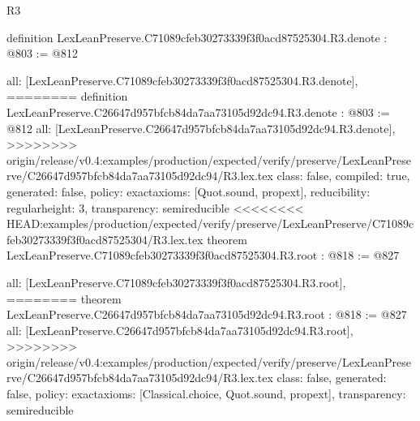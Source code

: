 \begin{lexlean}{R3}
\begin{coremodule}
{{{{{{definition LexLeanPreserve.C71089cfeb30273339f3f0acd87525304.R3.denote : @803 := @812 {
  all: [LexLeanPreserve.C71089cfeb30273339f3f0acd87525304.R3.denote],
========
definition LexLeanPreserve.C26647d957bfcb84da7aa73105d92dc94.R3.denote : @803 := @812 {
  all: [LexLeanPreserve.C26647d957bfcb84da7aa73105d92dc94.R3.denote],
>>>>>>>> origin/release/v0.4:examples/production/expected/verify/preserve/LexLeanPreserve/C26647d957bfcb84da7aa73105d92dc94/R3.lex.tex
  class: false,
  compiled: true,
  generated: false,
  policy: exact{axioms: [Quot.sound, propext]},
  reducibility: regular{height: 3},
  transparency: semireducible
}
<<<<<<<< HEAD:examples/production/expected/verify/preserve/LexLeanPreserve/C71089cfeb30273339f3f0acd87525304/R3.lex.tex
theorem LexLeanPreserve.C71089cfeb30273339f3f0acd87525304.R3.root : @818 := @827 {
  all: [LexLeanPreserve.C71089cfeb30273339f3f0acd87525304.R3.root],
========
theorem LexLeanPreserve.C26647d957bfcb84da7aa73105d92dc94.R3.root : @818 := @827 {
  all: [LexLeanPreserve.C26647d957bfcb84da7aa73105d92dc94.R3.root],
>>>>>>>> origin/release/v0.4:examples/production/expected/verify/preserve/LexLeanPreserve/C26647d957bfcb84da7aa73105d92dc94/R3.lex.tex
  class: false,
  generated: false,
  policy: exact{axioms: [Classical.choice, Quot.sound, propext]},
  transparency: semireducible
}

}}}}}}}}
\end{coremodule}
\end{lexlean}
